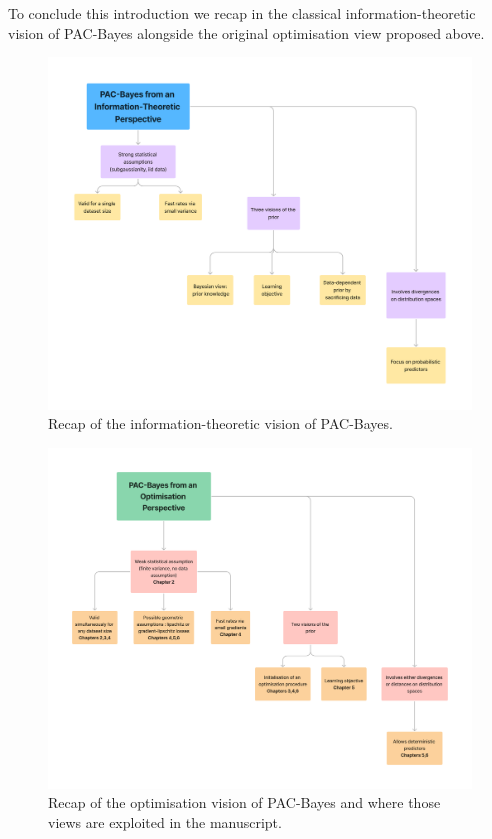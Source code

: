 To conclude this introduction we recap in  the classical information-theoretic vision of PAC-Bayes alongside the original optimisation view proposed above. 

\begin{figure}[!h]
  \centering
  \includegraphics[width=1.0\linewidth]{chapter_1/recap-info.pdf}
  \caption{Recap of the information-theoretic vision of PAC-Bayes.}
  \label{fig: recap-info}
\end{figure}
 
\begin{figure}[!h]
  \centering
  \includegraphics[width=1.0\linewidth]{chapter_1/recap-optim.pdf}
  \caption{Recap of the optimisation vision of PAC-Bayes and  where those views are exploited in the manuscript.}
  \label{fig: recap-optim}
\end{figure}


